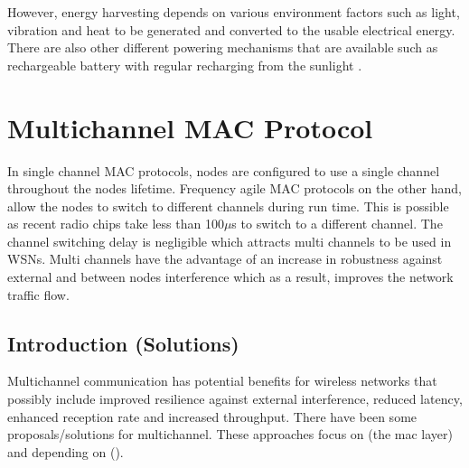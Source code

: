 However, energy harvesting depends on various environment factors such as light, vibration and heat to be generated and converted to the usable electrical energy. There are also other different powering mechanisms that are available such as rechargeable battery with regular recharging from the sunlight \cite{macsurvey}. 

\section{Multichannel MAC Protocol}
In single channel MAC protocols, nodes are configured to use a single channel throughout the nodes lifetime. Frequency agile MAC protocols on the other hand, allow the nodes to switch to different channels during run time. This is possible as recent radio chips take less than 100$\mu$s to switch to a different channel. The channel switching delay is negligible which attracts multi channels to be used in WSNs. Multi channels have the advantage of an increase in robustness against external and between nodes interference which as a result, improves the network traffic flow.




\subsection{Introduction (Solutions)}
Multichannel communication has potential benefits for wireless networks that possibly include improved resilience against external interference, reduced latency, enhanced reception rate and increased throughput. 
There have been some proposals/solutions for multichannel. These approaches focus on (the mac layer) and depending on ().

